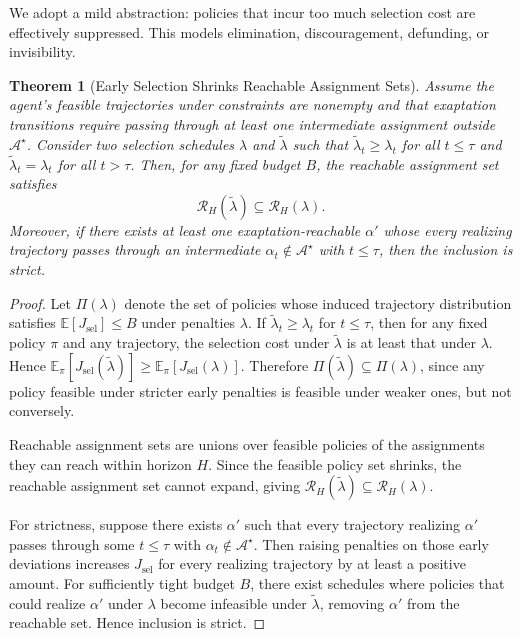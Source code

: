 \documentclass[11pt]{article}
\newtheorem{theorem}{Theorem}
\theoremstyle{definition}
\begin{document}
We adopt a mild abstraction: policies that incur too much selection cost are effectively suppressed. This models elimination, discouragement, defunding, or invisibility.

\begin{theorem}[Early Selection Shrinks Reachable Assignment Sets]
Assume the agent's feasible trajectories under constraints are nonempty and that exaptation transitions require passing through at least one intermediate assignment outside $\mathcal{A}^\star$. Consider two selection schedules $\lambda$ and $\tilde{\lambda}$ such that $\tilde{\lambda}_t\ge \lambda_t$ for all $t\le \tau$ and $\tilde{\lambda}_t=\lambda_t$ for all $t>\tau$. Then, for any fixed budget $B$, the reachable assignment set satisfies
\[
\mathcal{R}_H(\tilde{\lambda}) \subseteq \mathcal{R}_H(\lambda).
\]
Moreover, if there exists at least one exaptation-reachable $\alpha'$ whose every realizing trajectory passes through an intermediate $\alpha_t\notin\mathcal{A}^\star$ with $t\le \tau$, then the inclusion is strict.
\end{theorem}

\begin{proof}
Let $\Pi(\lambda)$ denote the set of policies whose induced trajectory distribution satisfies $\mathbb{E}[J_{\mathrm{sel}}]\le B$ under penalties $\lambda$. If $\tilde{\lambda}_t\ge \lambda_t$ for $t\le\tau$, then for any fixed policy $\pi$ and any trajectory, the selection cost under $\tilde{\lambda}$ is at least that under $\lambda$. Hence $\mathbb{E}_{\pi}[J_{\mathrm{sel}}(\tilde{\lambda})]\ge \mathbb{E}_{\pi}[J_{\mathrm{sel}}(\lambda)]$. Therefore $\Pi(\tilde{\lambda})\subseteq \Pi(\lambda)$, since any policy feasible under stricter early penalties is feasible under weaker ones, but not conversely.

Reachable assignment sets are unions over feasible policies of the assignments they can reach within horizon $H$. Since the feasible policy set shrinks, the reachable assignment set cannot expand, giving $\mathcal{R}_H(\tilde{\lambda}) \subseteq \mathcal{R}_H(\lambda)$.

For strictness, suppose there exists $\alpha'$ such that every trajectory realizing $\alpha'$ passes through some $t\le\tau$ with $\alpha_t\notin\mathcal{A}^\star$. Then raising penalties on those early deviations increases $J_{\mathrm{sel}}$ for every realizing trajectory by at least a positive amount. For sufficiently tight budget $B$, there exist schedules where policies that could realize $\alpha'$ under $\lambda$ become infeasible under $\tilde{\lambda}$, removing $\alpha'$ from the reachable set. Hence inclusion is strict.
\end{proof}
\end{document}
